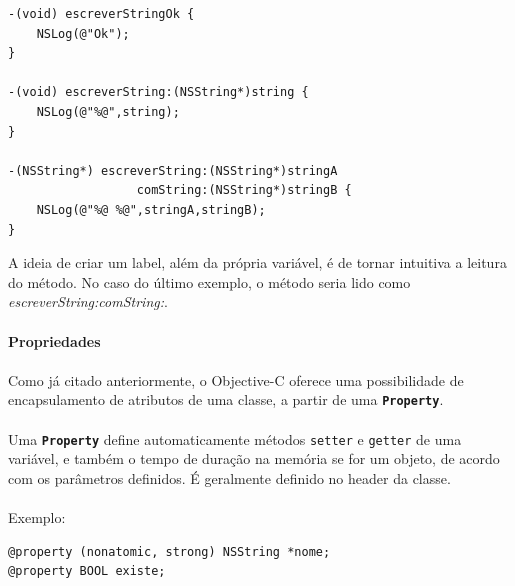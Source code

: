 \documentclass[a4paper,12pt,brazil,doubleside]{book}
\begin{document}
\begin{listing}
\begin{verbatim}
-(void) escreverStringOk {
	NSLog(@"Ok");
}

-(void) escreverString:(NSString*)string {
	NSLog(@"%@",string);
}

-(NSString*) escreverString:(NSString*)stringA
                  comString:(NSString*)stringB {
	NSLog(@"%@ %@",stringA,stringB);
}
\end{verbatim}
\end{listing}

A ideia de criar um label, além da própria variável, é de tornar intuitiva a leitura do método. No caso do último exemplo, o método seria lido como \emph{escreverString:comString:}.\\

\paragraph{}\textbf{Propriedades}

\paragraph{}Como já citado anteriormente, o Objective-C oferece uma possibilidade de encapsulamento de atributos de uma classe, a partir de uma \texttt{\textbf{Property}}.
\paragraph{}Uma \texttt{\textbf{Property}} define automaticamente métodos \texttt{setter} e \texttt{getter} de uma variável, e também o tempo de duração na memória se for um objeto, de acordo com os parâmetros definidos. É geralmente definido no header da classe.
\paragraph{}Exemplo:

\begin{listing}
\begin{verbatim}
@property (nonatomic, strong) NSString *nome;
@property BOOL existe;
\end{verbatim}
\end{listing}
\end{document}
